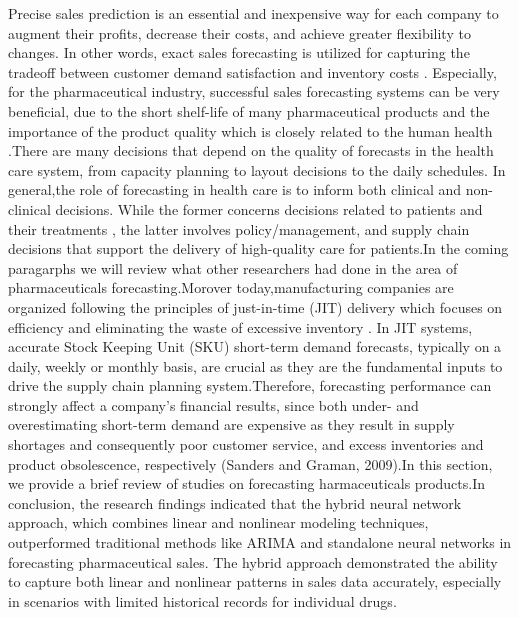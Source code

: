 \documentclass[
  authoryear,
  preprint,
  3p]{elsarticle}
\begin{document}
Precise sales prediction is an essential and inexpensive way for each
company to augment their profits, decrease their costs, and achieve
greater flexibility to changes. In other words, exact sales forecasting
is utilized for capturing the tradeoff between customer demand
satisfaction and inventory costs \citep{gupta2000mid}. Especially, for
the pharmaceutical industry, successful sales forecasting systems can be
very beneficial, due to the short shelf-life of many pharmaceutical
products and the importance of the product quality which is closely
related to the human health \citep{doganis2006time}.There are many
decisions that depend on the quality of forecasts in the health care
system, from capacity planning to layout decisions to the daily
schedules. In general,the role of forecasting in health care is to
inform both clinical and non-clinical decisions. While the former
concerns decisions related to patients and their treatments
\citep{makridakis2019forecasting}, the latter involves
policy/management, and supply chain decisions that support the delivery
of high-quality care for patients.In the coming paragarphs we will
review what other researchers had done in the area of pharmaceuticals
forecasting.Morover today,manufacturing companies are organized
following the principles of just-in-time (JIT) delivery which focuses on
efficiency and eliminating the waste of excessive inventory
\citep{van2021using}. In JIT systems, accurate Stock Keeping Unit (SKU)
short-term demand forecasts, typically on a daily, weekly or monthly
basis, are crucial as they are the fundamental inputs to drive the
supply chain planning system.Therefore, forecasting performance can
strongly affect a company's financial results, since both under- and
overestimating short-term demand are expensive as they result in supply
shortages and consequently poor customer service, and excess inventories
and product obsolescence, respectively (Sanders and Graman, 2009).In
this section, we provide a brief review of studies on forecasting
harmaceuticals products.In conclusion, the research findings indicated
that the hybrid neural network approach, which combines linear and
nonlinear modeling techniques, outperformed traditional methods like
ARIMA and standalone neural networks in forecasting pharmaceutical
sales. The hybrid approach demonstrated the ability to capture both
linear and nonlinear patterns in sales data accurately, especially in
scenarios with limited historical records for individual drugs.
\end{document}
